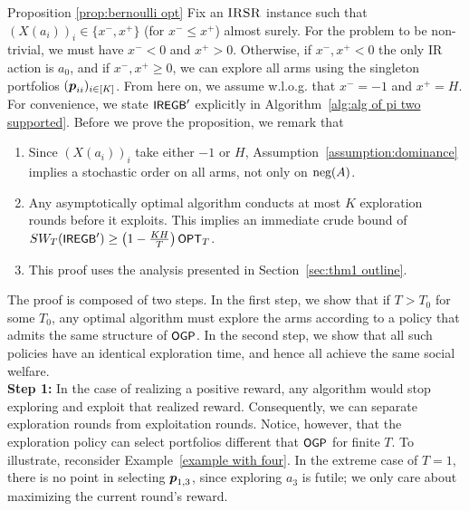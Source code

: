 \begin{proofof}{Proposition \ref{prop:bernoulli opt}}
Fix an $\textsc{IRSR}$ instance such that $(X(a_i))_i \in \{x^-,x^+\}$ (for $x^- \leq x^+$) almost surely. For the problem to be non-trivial, we must have $x^- <0$ and $x^+ >0$. Otherwise, if  $x^-,x^+ <0$ the only IR action is $a_0$, and if $x^-,x^+ \geq 0$, we can explore all arms using the singleton portfolios $(\boldsymbol{ p }_{ii})_{i \in [K]}$. From here on, we assume w.l.o.g. that $x^- = -1$ and $x^+=H$. For convenience, we state ${\small\textnormal{\textsf{IREGB}}}'$ explicitly in Algorithm~\ref{alg:alg of pi two supported}. Before we prove the proposition, we remark that
\begin{enumerate}
    \item Since $(X(a_i))_i$ take either $-1$ or $H$, Assumption~\ref{assumption:dominance} implies a stochastic order on all arms, not only on $\textnormal{neg}(A)$. 
    \item Any asymptotically optimal algorithm conducts at most $K$ exploration rounds before it exploits. This implies an immediate crude bound of
    $SW_T({\small\textnormal{\textsf{IREGB}}}') \geq \left(  1-\frac{KH}{T}\right) {\small\textnormal{\textsf{OPT}}}_T$.
    \item This proof uses the analysis presented in Section~\ref{sec:thm1 outline}.
\end{enumerate}


The proof is composed of two steps. In the first step, we show that if $T > T_0$ for some $T_0$, any optimal algorithm must explore the arms according to a policy that admits the same structure of ${\small\textnormal{\textsf{OGP}}}$. In the second step, we show that all such policies have an identical exploration time, and hence all achieve the same social welfare.\\
\textbf{Step 1:} In the case of realizing a positive reward, any algorithm would stop exploring and exploit that realized reward. Consequently, we can separate exploration rounds from exploitation rounds. Notice, however, that the exploration policy can select portfolios different that ${\small\textnormal{\textsf{OGP}}}$ for finite $T$. To illustrate, reconsider Example~\ref{example with four}. In the extreme case of $T=1$, there is no point in selecting $\boldsymbol{ p }_{1,3}$, since exploring $a_3$ is futile; we only care about maximizing the current round's reward.


\end{proofof}

